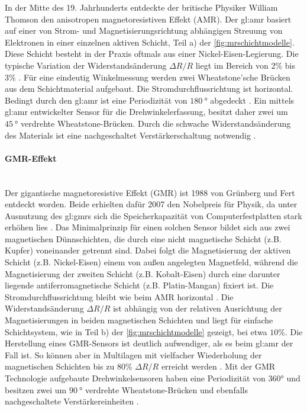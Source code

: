 In der Mitte des 19. Jahrhunderts entdeckte der britische Physiker William Thomson den anisotropen magnetoresistiven Effekt (AMR). Der \gls{gl:amr} basiert auf einer von Strom- und Magnetisierungsrichtung abhängigen Streuung von Elektronen in einer einzelnen aktiven Schicht, Teil a) der \autoref{fig:mrschichtmodelle}. Diese Schicht besteht in der Praxis oftmals aus einer Nickel-Eisen-Legierung. Die typische Variation der Widerstandsänderung $\Delta R/R$ liegt im Bereich von $2\%$ bis $3\%$ \cite{Tille2020}. Für eine eindeutig Winkelmessung werden zwei Wheatstone'sche Brücken aus dem Schichtmaterial aufgebaut. Die Stromdurchflussrichtung ist horizontal. Bedingt durch den \gls{gl:amr} ist eine Periodizität von $\SI{180}{\degree}$ abgedeckt \cite{Lemme2016}\cite{Tille2020}. Ein mittels \gls{gl:amr} entwickelter Sensor für die Drehwinkelerfassung, besitzt daher zwei um $\SI{45}{\degree}$ verdrehte Wheatstone-Brücken. Durch die schwache Widerstandsänderung des Materials ist eine nachgeschaltet Verstärkerschaltung notwendig \cite{NXPSemiconductors2014}.


\paragraph{GMR-Effekt}\label{par:GMR}$~$\\


Der gigantische magnetoresistive Effekt (GMR) ist 1988 von Grünberg und Fert entdeckt worden. Beide erhielten dafür 2007 den Nobelpreis für Physik, da unter Ausnutzung des \gls{gl:gmr}s sich die Speicherkapazität von Computerfestplatten stark erhöhen lies \cite{Lemme2016}. Das Minimalprinzip für einen solchen Sensor bildet sich aus zwei magnetischen Dünnschichten, die durch eine nicht magnetische Schicht (z.B. Kupfer) voneinander getrennt sind. Dabei folgt die Magnetisierung der aktiven Schicht (z.B. Nickel-Eisen) einem von außen angelegten Magnetfeld, während die Magnetisierung der zweiten Schicht (z.B. Kobalt-Eisen) durch eine darunter liegende antiferromagnetische Schicht (z.B. Platin-Mangan) fixiert ist. Die Stromdurchflussrichtung bleibt wie beim AMR horizontal \cite{Lemme2016}\cite{Tille2020}. Die Widerstandsänderung $\Delta R/R$ ist abhängig von der relativen Ausrichtung der Magnetisierungen in beiden magnetischen Schichten und liegt für einfache Schichtsystem, wie in Teil b) der \autoref{fig:mrschichtmodelle} gezeigt, bei etwa $10\%$. Die Herstellung eines GMR-Sensors ist deutlich aufwendiger, als es beim \gls{gl:amr} der Fall ist. So können aber in Multilagen mit vielfacher Wiederholung der magnetischen Schichten bis zu
$80\%$ $\Delta R/R$ erreicht werden \cite{Tille2020}. Mit der GMR Technologie aufgebaute Drehwinkelsensoren haben eine Periodizität von 360° und besitzen zwei um $\SI{90}{\degree}$ verdrehte Wheatstone-Brücken und ebenfalls nachgeschaltete Verstärkereinheiten \cite{infineon2018}.


